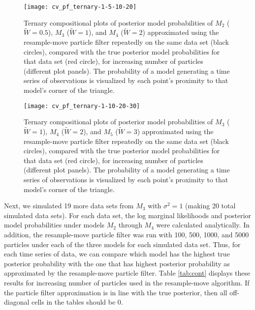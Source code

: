 \documentclass{article}
\begin{document}
\begin{figure}
\texttt{[image: cv\_pf\_ternary-1-5-10-20]}
\caption{Ternary compositional plots of posterior model probabilities of $M_2$ ($\tilde{W} = 0.5$), $M_3$ ($\tilde{W} = 1$), and $M_4$ ($\tilde{W} = 2$) approximated using the resample-move particle filter repeatedly on the same data set (black circles), compared with the true posterior model probabilities for that data set (red circle), for increasing number of particles (different plot panels). The probability of a model generating a time series of observations is visualized by each point's proximity to that model's corner of the triangle.} \label{fig:pf-1sim-ternary2}
\end{figure}

\begin{figure}
\texttt{[image: cv\_pf\_ternary-1-10-20-30]}
\caption{Ternary compositional plots of posterior model probabilities of $M_3$ ($\tilde{W} = 1$), $M_4$ ($\tilde{W} = 2$), and $M_5$ ($\tilde{W} = 3$) approximated using the resample-move particle filter repeatedly on the same data set (black circles), compared with the true posterior model probabilities for that data set (red circle), for increasing number of particles (different plot panels). The probability of a model generating a time series of observations is visualized by each point's proximity to that model's corner of the triangle.} \label{fig:pf-1sim-ternary3}
\end{figure}

Next, we simulated 19 more data sets from $M_3$ with $\sigma^2 = 1$ (making 20 total simulated data sets). For each data set, the log marginal likelihoods and posterior model probabilities under models $M_2$ through $M_4$ were calculated analytically. In addition, the resample-move particle filter was run with 100, 500, 1000, and 5000 particles under each of the three models for each simulated data set. Thus, for each time series of data, we can compare which model has the highest true posterior probability with the one that has highest posterior probability as approximated by the resample-move particle filter. Table \ref{tab:cont} displays these results for increasing number of particles used in the resample-move algorithm. If the particle filter approximation is in line with the true posterior, then all off-diagonal cells in the tables should be 0.
\end{document}
